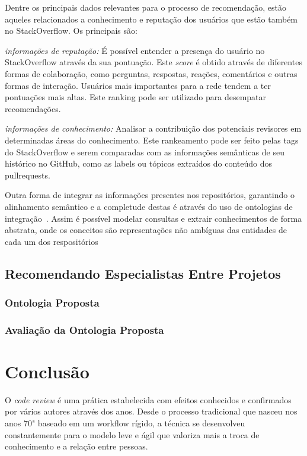 \documentclass[a4paper,12pt]{monografia}
\theoremstyle{plain}
\theoremstyle{definition}
\theoremstyle{remark}
\begin{document}
Dentre os principais dados relevantes para o processo de recomendação, estão aqueles relacionados a conhecimento e reputação dos usuários que estão também no StackOverflow. Os principais são:

\textit{informações de reputação: } É possível entender a presença do usuário no StackOverflow através da sua pontuação. Este \textit{score} é obtido através de diferentes formas de colaboração, como perguntas, respostas, reações, comentários e outras formas de interação. Usuários mais importantes para a rede tendem a ter pontuações mais altas. Este ranking pode ser utilizado para desempatar recomendações.

\textit{informações de conhecimento: } Analisar a contribuição dos potenciais revisores em determinadas áreas do conhecimento. Este rankeamento pode ser feito pelas tags do StackOverflow e serem comparadas com as informações semânticas de seu histórico no GitHub, como as labels ou tópicos extraídos do conteúdo dos pullrequests.

Outra forma de integrar as informações presentes nos repositórios, garantindo o alinhamento semântico e a completude destas é através do uso de ontologias de integração~\cite{pinto2001}. Assim é possível modelar consultas e extrair conhecimentos de forma abstrata, onde os conceitos são representações não ambíguas das entidades de cada um dos respositórios~\cite{calvanese2002}

\section{Recomendando Especialistas Entre Projetos}

\subsection{Ontologia Proposta}

\subsection{Avaliação da Ontologia Proposta}


\chapter{Conclusão}\label{cha:conclusao}

O \textit{code review} é uma prática estabelecida com efeitos conhecidos e confirmados por vários autores através dos anos. Desde o processo tradicional que nasceu nos anos 70" baseado em um workflow rígido, a técnica se desenvolveu constantemente para o modelo leve e ágil que valoriza mais a troca de conhecimento e a relação entre pessoas.
\end{document}

